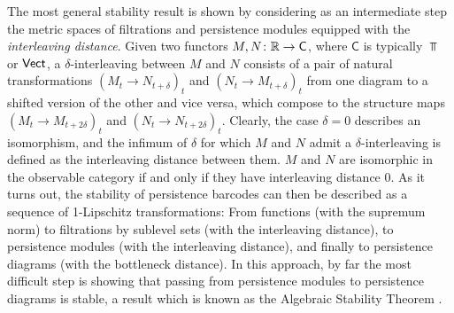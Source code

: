 The most general stability result is shown by considering as an intermediate step the metric spaces of filtrations and persistence modules equipped with the \emph{interleaving distance}.
Given two functors $M,N \colon \mathbb{R} \to \mathsf C$, where $\mathsf C$ is typically $\Top$ or $\mathsf{Vect}$, a $\delta$-interleaving between $M$ and $N$ consists of a pair of natural transformations $(M_t \to N_{t+\delta})_t$ and $(N_t \to M_{t+\delta})_t$ from one diagram to a shifted version of the other and vice versa, which compose to the structure maps $(M_t \to M_{t+2\delta})_t$ and $(N_t \to N_{t+2\delta})_t$.
Clearly, the case $\delta=0$ describes an isomorphism, and the infimum of $\delta$ for which $M$ and $N$ admit a $\delta$-interleaving is defined as the interleaving distance between them.
$M$ and $N$ are isomorphic in the observable category if and only if they have interleaving distance $0$.
As it turns out, the stability of persistence barcodes can then be described as a sequence of 1-Lipschitz transformations: From functions (with the supremum norm) to filtrations by sublevel sets (with the interleaving distance), to persistence modules (with the interleaving distance), and finally to persistence diagrams (with the bottleneck distance).
In this approach, by far the most difficult step is showing that passing from persistence modules to persistence diagrams is stable, a result which is known as the Algebraic Stability Theorem \cite{Chazal.2009, Bauer.2015, Chazal.2016a}.



